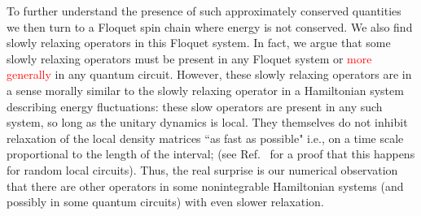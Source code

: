 \documentclass[twocolumn,superscriptaddress, prl,showpacs]{revtex4-1}
\newcommand{\addr}[1]{\textcolor{red}{#1}}
\begin{document}
To further understand the presence of such approximately conserved quantities we then turn to a Floquet spin chain where energy is not conserved.
We also find slowly relaxing operators in this Floquet system.
In fact, we argue that some slowly relaxing operators must be present in any Floquet system or \addr{more generally} in any quantum circuit.
However, these slowly relaxing operators are in a sense morally similar to the slowly relaxing operator in a Hamiltonian system describing energy fluctuations: these slow operators are present in any such system, so long as the unitary dynamics is local.  They themselves do not inhibit relaxation of the local density matrices ``as fast as possible" i.e., on a time scale proportional to the length of the interval;
(see Ref.~ for a proof that this happens for random local circuits).
Thus, the real surprise is our numerical observation that there are other operators in some nonintegrable Hamiltonian systems (and possibly in some quantum circuits) with even slower relaxation.
\end{document}
